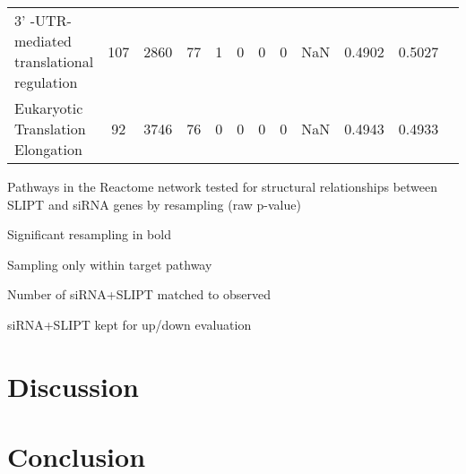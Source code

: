 \begin{table*}[!htb]
{{\begin{threeparttable}
\begin{tabular}{lccccccccccc}
\rowcolor{black!10}
3' -UTR-mediated translational regulation & 107         & 2860         & 77            & 1           & 0    & 0    & 0       & NaN          & 0.4902             & 0.5027              \\
\rowcolor{black!5}
Eukaryotic Translation Elongation         & 92          & 3746         & 76            & 0           & 0    & 0    & 0       & NaN          & 0.4943             & 0.4933              \\
\hline
\end{tabular}
\begin{tablenotes}
\raggedright \small
Pathways in the Reactome network tested for structural relationships between \gls{SLIPT} and \gls{siRNA} genes by resampling (raw p-value)

Significant resampling in bold

Sampling only within target pathway

Number of siRNA+SLIPT matched to observed

siRNA+SLIPT kept for up/down evaluation 
\end{tablenotes}
\end{threeparttable}
}
}
\end{table*}

\FloatBarrier

\section{Discussion}

\section{Conclusion}